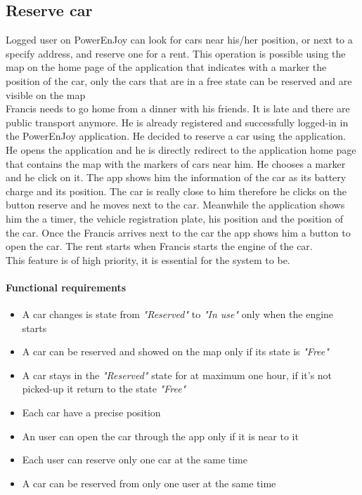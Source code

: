 \subsection{Reserve car}
Logged user on PowerEnJoy can look for cars near his/her position, or next to a specify address, and reserve one for a rent. This operation is possible using the map on the home page of the application that indicates with a marker the position of the car, only the cars that are in a free state can be reserved and are visible on the map
 \ \\
Francis needs to go home from a dinner with his friends. It is late and there are public transport anymore. He is already registered and successfully logged-in in the PowerEnJoy application. He decided to reserve a car using the application. He opens the application and he is directly redirect to the application home page that contains the map with the markers of cars near him. He chooses a marker and he click on it. The app shows him the information of the car as its battery charge and its position. The car is really close to him therefore he clicks on the button reserve and he moves next to the car. Meanwhile the application shows him the  a timer, the vehicle registration plate, his position and the position of the car. Once the Francis arrives next to the car the app shows him a button to open the car. The rent starts when Francis starts the engine of the car.
 \ \\
This feature is of high priority, it is essential for the system to be.
\paragraph{Functional requirements }
\begin{itemize}
	\item A car changes is state from \emph{"Reserved"} to \emph{"In use"} only when the engine starts
	\item A car can be reserved and showed on the map only if its state is \emph{"Free"}
	\item A car stays in the \emph{"Reserved"} state for at maximum one hour, if it's not picked-up it return to the state \emph{"Free"}
	\item Each car have a precise position
	\item An user can open the car through the app only if it is near to it
	\item Each user can reserve only one car at the same time
	\item A car can be reserved from only one user at the same time
\end{itemize}

